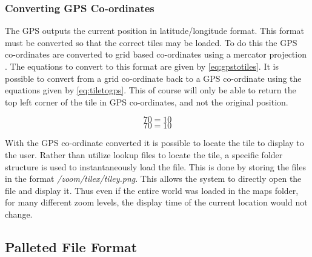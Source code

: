 
\subsubsection{Converting GPS Co-ordinates}

The GPS outputs the current position in latitude/longitude format. This format must be converted so that the correct tiles may be loaded. To do this the GPS co-ordinates are converted to grid based co-ordinates using a mercator projection \cite{slippy_map_tilenames}. The equations to convert to this format are given by \ref{eq:gpstotiles}. It is possible to convert from a grid co-ordinate back to a GPS co-ordinate using the equations given by \ref{eq:tiletogps}. This of course will only be able to return the top left corner of the tile in GPS co-ordinates, and not the original position.

\begin{equation}
\label{eq:gpstotiles}
70=10
\end{equation}
\begin{equation}
\label{eq:tilestogps}
70=10
\end{equation}

With the GPS co-ordinate converted it is possible to locate the tile to display to the user. Rather than utilize lookup files to locate the tile, a specific folder structure is used to instantaneously load the file. This is done by storing the files in the format \emph{/zoom/tilex/tiley.png}. This allows the system to directly open the file and display it. Thus even if the entire world was loaded in the maps folder, for many different zoom levels, the display time of the current location would not change.

\subsection{Palleted File Format}


